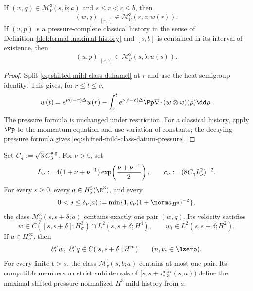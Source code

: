 \begin{lemma}
\label{lem:shifted-mild-restriction}
If \((w,q)\in\mathscr M_\nu^3(s,b;a)\) and
\(s\le r<c\le b\), then
\begin{equation}
 (w,q)|_{[r,c]}\in\mathscr M_\nu^3(r,c;w(r)).
 \label{eq:shifted-mild-restriction}
\end{equation}
If \((u,p)\) is a pressure-complete classical history in the sense of
Definition~\ref{def:formal-maximal-history} and
\([s,b]\) is contained in its interval of existence, then
\begin{equation}
 (u,p)|_{[s,b]}\in\mathscr M_\nu^3(s,b;u(s)).
 \label{eq:classical-mild-admission}
\end{equation}
\end{lemma}

\begin{proof}
Split \eqref{eq:shifted-mild-class-duhamel} at \(r\) and use the heat
semigroup identity.  This gives, for \(r\le t\le c\),
\[
 w(t)=e^{\nu(t-r)\Delta}w(r)
 -\int_r^t e^{\nu(t-\rho)\Delta}
 \Pp\nabla\!\cdot(w\otimes w)(\rho)\dd\rho.
\]
The pressure formula is unchanged under restriction.  For a classical
history, apply \(\Pp\) to the momentum equation and use variation of
constants; the decaying pressure formula gives
\eqref{eq:shifted-mild-class-datum-pressure}.
\end{proof}

\begin{theorem}
\label{thm:local-restart}
Set \(C_{\rm q}:=\sqrt3\,C_3^{\rm alg}\).  For \(\nu>0\), set
\[
 L_\nu:=4(1+\nu+\nu^{-1})
 \exp\!\left(\frac{\nu+\nu^{-1}}2\right),
 \qquad
 c_\nu:=(8C_{\rm q}L_\nu^2)^{-2}.
\]
For every \(s\ge0\), every \(a\in H^3_\sigma(\R^3)\), and every
\[
 0<\delta\le\delta_\nu(a)
 :=\min\{1,c_\nu(1+\norm a_{H^3})^{-2}\},
\]
the class \(\mathscr M_\nu^3(s,s+\delta;a)\) contains exactly one pair
\((w,q)\).  Its velocity satisfies
\[
 w\in C([s,s+\delta];H^3_\sigma)
 \cap L^2(s,s+\delta;H^4),
 \qquad
 w_t\in L^2(s,s+\delta;H^2).
\]
If \(a\in H^\infty_\sigma\), then
\[
 \partial_t^nw,\ \partial_t^nq
 \in C([s,s+\delta];H^m)
 \qquad(n,m\in\Nzero).
\]
For every finite \(b>s\), the class
\(\mathscr M_\nu^3(s,b;a)\) contains at most one pair.  Its compatible members
on strict subintervals of
\([s,s+\tau_{\nu,3}^{\max}(s,a))\) define the maximal shifted
pressure-normalized \(H^3\) mild history from \(a\).
\end{theorem}


